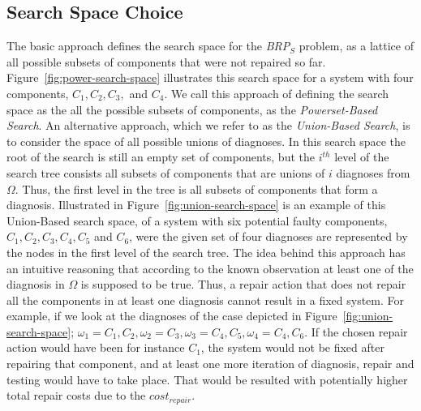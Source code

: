 \documentclass[a4paper,11pt]{report}
\newcommand\roni[1]{\textcolor{green}{roni: #1}}
\newcommand{\brps}{\textit{BRP$_S$}}
\newcommand{\cost}{\textit{cost}}
\begin{document}
\subsection{Search Space Choice}


The basic approach defines the search space for the \brps{} problem, as a lattice of all possible subsets of components that were not repaired so far. Figure~\ref{fig:power-search-space} illustrates this search space for a system with four components, $C_1, C_2, C_3,$ and $C_4$. We call this approach of defining the search space as the all the possible subsets of components, as the {\em Powerset-Based Search}. 
An alternative approach, which we refer to as the {\em Union-Based Search}, is to consider the space of all possible unions of diagnoses. In this search space the root of the search is still an empty set of components, but the $i^{th}$ level of the search tree consists all subsets of components that are unions of $i$ diagnoses from $\Omega$. Thus, the first level in the tree is all subsets of components that form a diagnosis. Illustrated in Figure~\ref{fig:union-search-space} is an example of this Union-Based search space, of a system with six potential faulty components, $C_1, C_2, C_3, C_4, C_5$ and $C_6$, were the given set of four diagnoses are represented by the nodes in the first level of the search tree.
The idea behind this approach has an intuitive reasoning that according to the known observation at least one of the diagnosis in $\Omega$ is supposed to be true. Thus, a repair action that does not repair all the components in at least one diagnosis cannot result in a fixed system. For example, if we look at the diagnoses of the case depicted in Figure~\ref{fig:union-search-space}; $\omega_1={C_1,C_2}, \omega_2={C_3}, \omega_3={C_4,C_5}, \omega_4={C_4,C_6}$. If the chosen repair action would have been for instance ${C_1}$, the system would not be fixed after repairing that component, and at least one more iteration of diagnosis, repair and testing would have to take place. That would be resulted with potentially higher total repair costs due to the $\cost_{repair}$.
\end{document}
